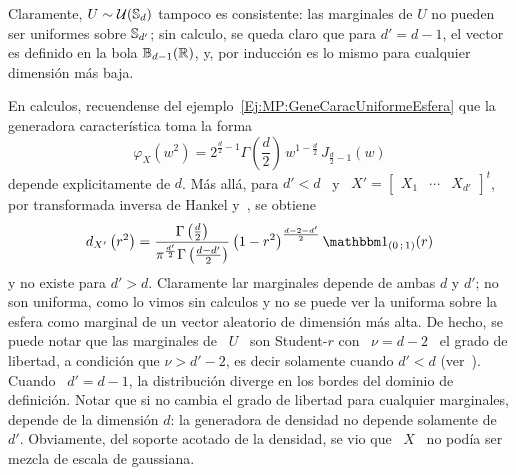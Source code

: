 \begin{ejemplo}
\label{Ej:MP:UniformeCnt}
%
  Claramente, $U \sim \mathcal{U}(\mathbb{S}_d)$ tampoco es consistente: las marginales de $U$
  no pueden  ser uniformes sobre $\mathbb{S}_{d'}$;  sin calculo, se  queda claro que
  para $d' = d-1$, el vector es definido en la bola $\mathbb{B}_{d-1}(\mathbb{R})$, y, por
  inducci\'on es lo mismo para cualquier dimensi\'on m\'as baja.

  En  calculos, recuendense del  ejemplo~\ref{Ej:MP:GeneCaracUniformeEsfera} que
  la generadora caracter\'istica toma la forma
  \[
  \varphi_X\left(  w^2  \right)  =  2^{\frac{d}{2}-1}  \Gamma\left(  \frac{d}{2}
  \right) \, w^{1-\frac{d}{2}} \, J_{\frac{d}{2}-1}\left( w \right)
  \]
  depende  explicitamente  de $d$.  M\'as  all\'a,  para $d'  <  d$  \  y \  $X'
  =  \begin{bmatrix} X_1 &  \cdots &  X_{d'} \end{bmatrix}^t$,  por transformada
  inversa de Hankel y~\cite[Ec.~6.575-1]{GraRyz15}, se obtiene
  \[
  d_{X'}\left(     r^2      \right)     =     \frac{\Gamma\left(     \frac{d}{2}
    \right)}{\pi^{\frac{d'}{2}} \Gamma\left( \frac{d-d'}{2}  \right)} \left( 1 -
    r^2 \right)^{\frac{d-2-d'}{2}} \un_{(0 \; 1)}(r)
  \]
  y no existe para  $d' > d$.  Claramente lar marginales depende  de ambas $d$ y
  $d'$;  no son  uniforma, como  lo vimos  sin  calculos y  no se  puede ver  la
  uniforma sobre la  esfera como marginal de un  vector aleatorio de dimensi\'on
  m\'as  alta.  De  hecho, se  puede notar  que las  marginales de  \ $U$  \ son
  Student-$r$ con \ $\nu = d-2$ \ el grado de libertad, a condici\'on que $\nu >
  d'-2$, es decir solamente cuando $d' < d$ (ver~\cite{titi, toto, Zoz}). Cuando
  \  $d'  =  d-1$, la  distribuci\'on  diverge  en  los  bordes del  dominio  de
  definici\'on.   Notar que si  no cambia  el grado  de libertad  para cualquier
  marginales,  depende de  la  dimensi\'on  $d$: la  generadora  de densidad  no
  depende solamente de $d'$.  Obviamente, del soporte acotado de la densidad, se
  vio que \ $X$ \ no pod\'ia ser mezcla de escala de gaussiana.
\end{ejemplo}

